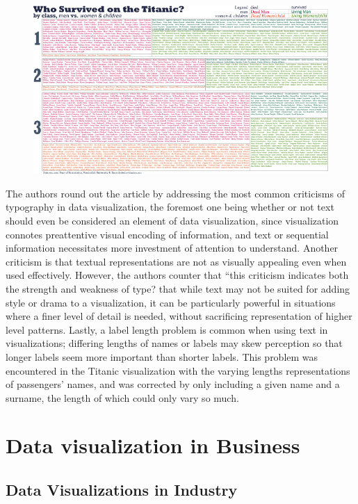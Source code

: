 \documentclass[]{book}
\theoremstyle{definition}
\theoremstyle{definition}
\theoremstyle{definition}
\theoremstyle{remark}
\begin{document}
\begin{figure}
\centering
\includegraphics{images/TypographicTitanic.jpg}
\caption{}
\end{figure}

The authors round out the article by addressing the most common
criticisms of typography in data visualization, the foremost one being
whether or not text should even be considered an element of data
visualization, since visualization connotes preattentive visual encoding
of information, and text or sequential information necessitates more
investment of attention to understand. Another criticism is that textual
representations are not as visually appealing even when used
effectively. However, the authors counter that ``this criticism
indicates both the strength and weakness of type? that while text may
not be suited for adding style or drama to a visualization, it can be
particularly powerful in situations where a finer level of detail is
needed, without sacrificing representation of higher level patterns.
Lastly, a label length problem is common when using text in
visualizations; differing lengths of names or labels may skew perception
so that longer labels seem more important than shorter labels. This
problem was encountered in the Titanic visualization with the varying
lengths representations of passengers' names, and was corrected by only
including a given name and a surname, the length of which could only
vary so much.

\section{Data visualization in
Business}\label{data-visualization-in-business}

\subsection{Data Visualizations in
Industry}\label{data-visualizations-in-industry}
\end{document}
